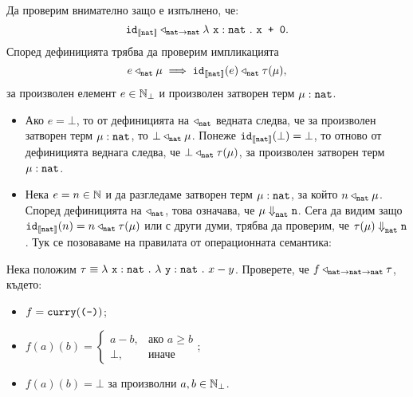 \begin{example}
  Да проверим внимателно защо е изпълнено, че:
  \[\texttt{id}_{\val{\nat}} \triangleleft_{\vv{nat}\to\vv{nat}} \lamb{x}{nat}{\vv{x + 0}}.\]
  Според дефиницията трябва да проверим импликацията
  \[e \triangleleft_{\nat} \mu \implies \texttt{id}_{\val{\nat}}(e) \triangleleft_{\nat} \tau(\mu),\]
  за произволен елемент $e \in \Nat_\bot$ и произволен затворен терм $\mu : \nat$.
  \begin{itemize}
  \item
    Ако $e = \bot$, то от дефиницията на $\triangleleft_{\nat}$ ведната следва, че за произволен затворен терм $\mu : \nat$, то
    $\bot \triangleleft_{\nat} \mu$. Понеже $\texttt{id}_{\val{\nat}}(\bot) = \bot$, то отново от дефиницията веднага следва, че
    $\bot \triangleleft_{\nat} \tau(\mu)$, за произволен затворен терм $\mu : \nat$.
  \item
    Нека $e = n\in\Nat$ и да разгледаме затворен терм $\mu : \nat$, за който $n \triangleleft_{\nat} \mu$.
    Според дефиницията на $\triangleleft_{\nat}$, това означава, че $\mu \opsem{}{nat} \vv{n}$.
    Сега да видим защо $\texttt{id}_{\val{\nat}}(n) = n \triangleleft_{\nat} \tau(\mu)$ или с други думи,
    трябва да проверим, че $\tau(\mu) \opsem{}{nat} \vv{n}$. Тук се позоваваме на правилата от операционната семантика:
    \begin{prooftree}
    \end{prooftree}
  \end{itemize}

\end{example}

\begin{problem}
  Нека положим $\tau \equiv \lamb{x}{nat}{\lamb{y}{nat}{x-y}}$.
  Проверете, че $f \triangleleft_{\nat\to\nat\to\nat} \tau$, където:
  \begin{itemize}
  \item
    $f = \curry(\minus)$;
  \item
    $f(a)(b) =
    \begin{cases}
      a-b, & \text{ако }a \geq b\\
      \bot, & \text{иначе}
    \end{cases}$;
  \item
    $f(a)(b) = \bot$ за произволни $a,b\in\Nat_\bot$.
  \end{itemize}
\end{problem}


